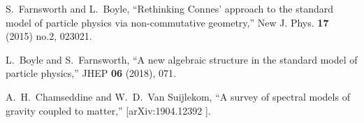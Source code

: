 \documentclass[letterpaper,11pt]{article}
\begin{document}
\begin{thebibliography}{99}
S.~Farnsworth and L.~Boyle,
``Rethinking Connes' approach to the standard model of particle physics via non-commutative geometry,''
New J. Phys. \textbf{17} (2015) no.2, 023021.


L.~Boyle and S.~Farnsworth,
``A new algebraic structure in the standard model of particle physics,''
JHEP \textbf{06} (2018), 071.


A.~H.~Chamseddine and W.~D.~Van Suijlekom,
``A survey of spectral models of gravity coupled to matter,''
[arXiv:1904.12392 ].
















































  








\end{thebibliography}
\end{document}
